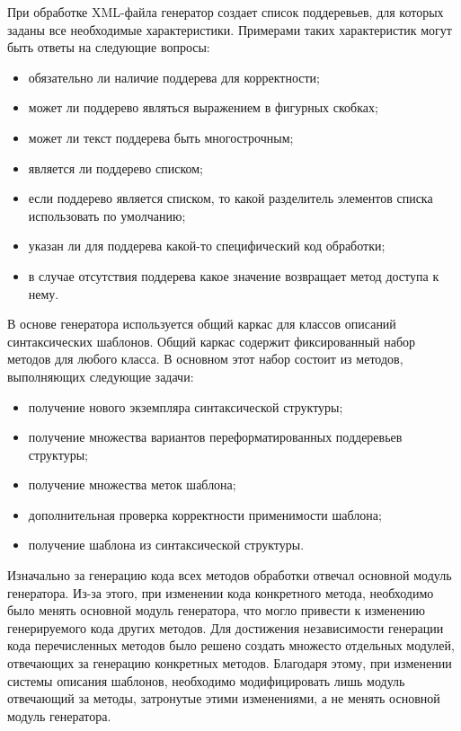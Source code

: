 \documentclass{matmex-diploma}
\begin{document}
При обработке XML-файла генератор создает список поддеревьев, для которых заданы все необходимые характеристики. Примерами таких характеристик могут быть ответы на следующие вопросы: 
\begin{itemize}
\item обязательно ли наличие поддерева для корректности;
\item может ли поддерево являться выражением в фигурных скобках;
\item может ли текст поддерева быть многострочным;
\item является ли поддерево списком;
\item если поддерево является списком, то какой разделитель элементов списка использовать по умолчанию;
\item указан ли для поддерева какой-то специфический код обработки;
\item в случае отсутствия поддерева какое значение возвращает метод доступа к нему.
\end{itemize}

В основе генератора используется общий каркас для классов описаний синтаксических шаблонов. Общий каркас содержит фиксированный набор методов для любого класса. В основном этот набор состоит из методов, выполняющих следующие задачи:
\begin{itemize}
\item получение нового экземпляра синтаксической структуры;
\item получение множества вариантов переформатированных поддеревьев структуры;
\item получение множества меток шаблона;
\item дополнительная проверка корректности применимости шаблона;
\item получение шаблона из синтаксической структуры.
\end{itemize}

Изначально за генерацию кода всех методов обработки отвечал основной модуль генератора. Из-за этого, при изменении кода конкретного метода, необходимо было менять основной модуль генератора, что могло привести к изменению генерируемого кода других методов. Для достижения независимости генерации кода перечисленных методов было решено создать множесто отдельных модулей, отвечающих за генерацию конкретных методов. Благодаря этому, при изменении системы описания шаблонов, необходимо модифицировать лишь модуль отвечающий за методы, затронутые этими изменениями, а не менять основной модуль генератора. 
\end{document}
